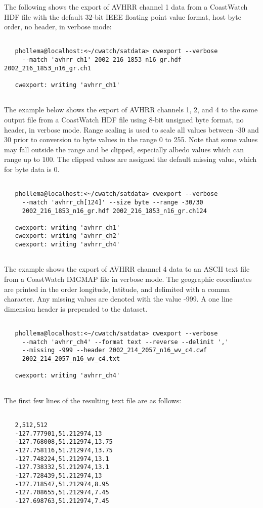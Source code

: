   The following shows the export of AVHRR channel 1 data from a CoastWatch HDF file with the default 32-bit IEEE floating point value format, host byte order, no header, in verbose mode: \begin{verbatim}

   phollema@localhost:<~/cwatch/satdata> cwexport --verbose 
     --match 'avhrr_ch1' 2002_216_1853_n16_gr.hdf 2002_216_1853_n16_gr.ch1

   cwexport: writing 'avhrr_ch1'
 
\end{verbatim}
 The example below shows the export of AVHRR channels 1, 2, and 4 to the same output file from a CoastWatch HDF file using 8-bit unsigned byte format, no header, in verbose mode. Range scaling is used to scale all values between -30 and 30 prior to conversion to byte values in the range 0 to 255. Note that some values may fall outside the range and be clipped, especially albedo values which can range up to 100. The clipped values are assigned the default missing value, which for byte data is 0. \begin{verbatim}

   phollema@localhost:<~/cwatch/satdata> cwexport --verbose 
     --match 'avhrr_ch[124]' --size byte --range -30/30 
     2002_216_1853_n16_gr.hdf 2002_216_1853_n16_gr.ch124

   cwexport: writing 'avhrr_ch1'
   cwexport: writing 'avhrr_ch2'
   cwexport: writing 'avhrr_ch4'
 
\end{verbatim}
 The example shows the export of AVHRR channel 4 data to an ASCII text file from a CoastWatch IMGMAP file in verbose mode. The geographic coordinates are printed in the order longitude, latitude, and delimited with a comma character. Any missing values are denoted with the value -999. A one line dimension header is prepended to the dataset. \begin{verbatim}

   phollema@localhost:<~/cwatch/satdata> cwexport --verbose 
     --match 'avhrr_ch4' --format text --reverse --delimit ',' 
     --missing -999 --header 2002_214_2057_n16_wv_c4.cwf 
     2002_214_2057_n16_wv_c4.txt

   cwexport: writing 'avhrr_ch4'
 
\end{verbatim}
 The first few lines of the resulting text file are as follows: \begin{verbatim}

   2,512,512
   -127.777901,51.212974,13
   -127.768008,51.212974,13.75
   -127.758116,51.212974,13.75
   -127.748224,51.212974,13.1
   -127.738332,51.212974,13.1
   -127.728439,51.212974,13
   -127.718547,51.212974,8.95
   -127.708655,51.212974,7.45
   -127.698763,51.212974,7.45
 
\end{verbatim}
